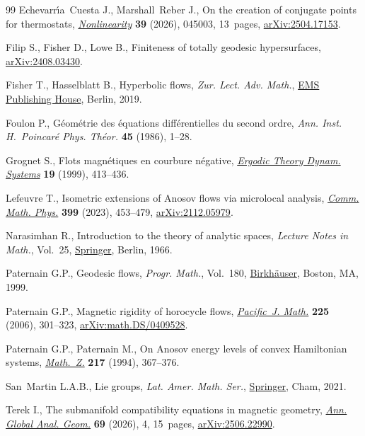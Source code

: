 \documentclass[10pt,a4paper]{amsart}
\numberwithin{equation}{section}
\theoremstyle{definition}
\begin{document}
\begin{thebibliography}{99}
Echevarr\'{\i}a~Cuesta J., Marshall~Reber J., On the creation of conjugate
 points for thermostats,
 \href{https://doi.org/10.1088/1361-6544/ae5569}{\textit{Nonlinearity}}
 \textbf{39} (2026), 045003, 13~pages,
 \href{http://arxiv.org/abs/2504.17153}{arXiv:2504.17153}.

Filip S., Fisher D., Lowe B., Finiteness of totally geodesic hypersurfaces,
 \href{http://arxiv.org/abs/2408.03430}{arXiv:2408.03430}.

Fisher T., Hasselblatt B., Hyperbolic flows, \textit{Zur. Lect. Adv. Math.},
 \href{https://doi.org/10.4171/200}{EMS Publishing House}, Berlin, 2019.

Foulon P., G\'{e}om\'{e}trie des \'{e}quations diff\'{e}rentielles du second
 ordre, \textit{Ann. Inst. H.~Poincar\'{e} Phys. Th\'{e}or.} \textbf{45}
 (1986), 1--28.

Grognet S., Flots magn\'{e}tiques en courbure n\'{e}gative,
 \href{https://doi.org/10.1017/S0143385799126634}{\textit{Ergodic Theory
 Dynam. Systems}} \textbf{19} (1999), 413--436.

Lefeuvre T., Isometric extensions of {A}nosov flows via microlocal analysis,
 \href{https://doi.org/10.1007/s00220-022-04561-0}{\textit{Comm. Math. Phys.}}
 \textbf{399} (2023), 453--479,
 \href{http://arxiv.org/abs/2112.05979}{arXiv:2112.05979}.

Narasimhan R., Introduction to the theory of analytic spaces, \textit{Lecture
 Notes in Math.}, Vol.~25, \href{https://doi.org/10.1007/BFb0077071}{Springer}, Berlin, 1966.

Paternain G.P., Geodesic flows, \textit{Progr. Math.}, Vol.~180,
 \href{https://doi.org/10.1007/978-1-4612-1600-1}{Birkh\"{a}user}, Boston, MA,
 1999.

Paternain G.P., Magnetic rigidity of horocycle flows,
 \href{https://doi.org/10.2140/pjm.2006.225.301}{\textit{Pacific~J. Math.}}
 \textbf{225} (2006), 301--323,
 \href{http://arxiv.org/abs/math.DS/0409528}{arXiv:math.DS/0409528}.

Paternain G.P., Paternain M., On {A}nosov energy levels of convex {H}amiltonian
 systems, \href{https://doi.org/10.1007/BF02571949}{\textit{Math.~Z.}}
 \textbf{217} (1994), 367--376.

San~Martin L.A.B., Lie groups, \textit{Lat. Amer. Math. Ser.},
 \href{https://doi.org/10.1007/978-3-030-61824-7}{Springer}, Cham, 2021.

Terek I., The submanifold compatibility equations in magnetic geometry,
 \href{https://doi.org/10.1007/s10455-026-10026-7}{\textit{Ann. Global Anal.
 Geom.}} \textbf{69} (2026), 4, 15~pages,
 \href{http://arxiv.org/abs/2506.22990}{arXiv:2506.22990}.

\end{thebibliography}
\end{document}
